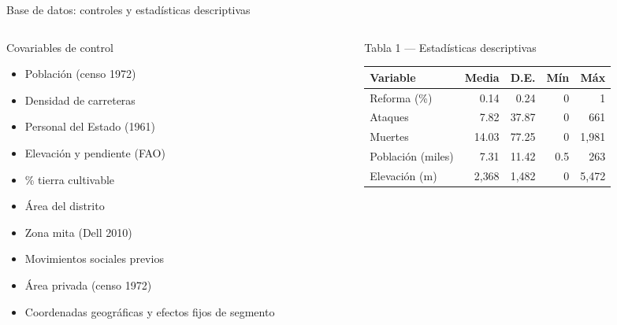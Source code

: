 \documentclass[aspectratio=169,t]{beamer}
\begin{document}
\begin{frame}{Base de datos: controles y estad\'isticas descriptivas}
\begin{columns}[T]
  \begin{column}{0.36\textwidth}
    \begin{block}{Covariables de control}
    \scriptsize\begin{itemize}
      \item Poblaci\'on (censo 1972)
      \item Densidad de carreteras
      \item Personal del Estado (1961)
      \item Elevaci\'on y pendiente (FAO)
      \item \% tierra cultivable
      \item \'Area del distrito
      \item Zona mita (Dell 2010)
      \item Movimientos sociales previos
      \item \'Area privada (censo 1972)
      \item Coordenadas geogr\'aficas y
            efectos fijos de segmento
    \end{itemize}
    \end{block}
  \end{column}
  \begin{column}{0.61\textwidth}
    \begin{block}{Tabla 1 --- Estad\'isticas descriptivas}
    \scriptsize
    \begin{tabular}{lrrrr}
      \toprule
      \rowcolor{azuloscuro}
      \color{white}Variable &
      \color{white}Media &
      \color{white}D.E. &
      \color{white}M\'in &
      \color{white}M\'ax \\
      \midrule
      \rowcolor{azulclaro!60}
      Reforma (\%) & 0.14 & 0.24 & 0 & 1 \\
      Ataques & 7.82 & 37.87 & 0 & 661 \\
      \rowcolor{azulclaro!60}
      Muertes & 14.03 & 77.25 & 0 & 1{,}981 \\
      Poblaci\'on (miles) & 7.31 & 11.42 & 0.5 & 263 \\
      \rowcolor{azulclaro!60}
      Elevaci\'on (m) & 2{,}368 & 1{,}482 & 0 & 5{,}472 \\

\end{tabular}
\end{block}
\end{column}
\end{columns}
\end{frame}
\end{document}
